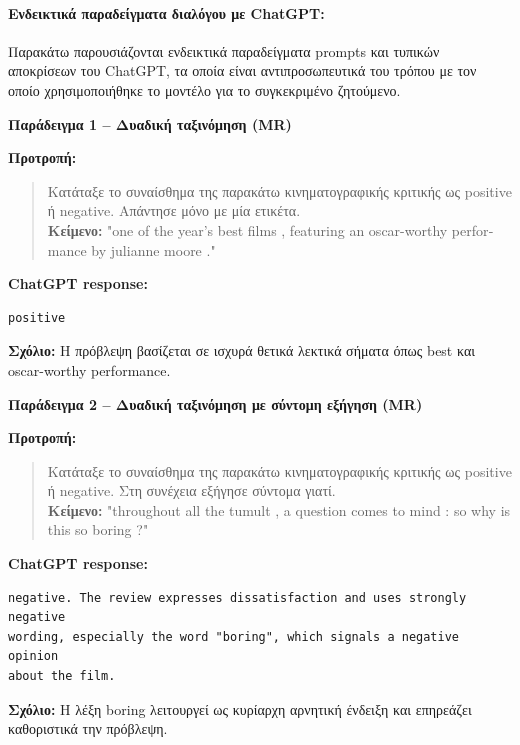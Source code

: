 \documentclass[11pt,a4paper]{article}
\begin{document}
\paragraph{Ενδεικτικά παραδείγματα διαλόγου με \textlatin{ChatGPT}:}

Παρακάτω παρουσιάζονται ενδεικτικά παραδείγματα \textlatin{prompts} και τυπικών αποκρίσεων του \textlatin{ChatGPT}, τα οποία είναι αντιπροσωπευτικά του τρόπου με τον οποίο χρησιμοποιήθηκε το μοντέλο για το συγκεκριμένο ζητούμενο.

\textbf{Παράδειγμα 1 -- Δυαδική ταξινόμηση (\textlatin{MR})}

\textbf{Προτροπή:}
\begin{quote}
Κατάταξε το συναίσθημα της παρακάτω κινηματογραφικής κριτικής ως \textlatin{positive} ή
\textlatin{negative}. Απάντησε μόνο με μία ετικέτα.\\
\textbf{Κείμενο:} \textlatin{"one of the year's best films , featuring an oscar-worthy performance by julianne moore ."}
\end{quote}

\textbf{\textlatin{ChatGPT response:}}
\begin{verbatim}
positive
\end{verbatim}

\textbf{Σχόλιο:} Η πρόβλεψη βασίζεται σε ισχυρά θετικά λεκτικά σήματα όπως \textlatin{best} και \textlatin{oscar-worthy performance}.

\textbf{Παράδειγμα 2 -- Δυαδική ταξινόμηση με σύντομη εξήγηση (\textlatin{MR})}

\textbf{Προτροπή:}
\begin{quote}
Κατάταξε το συναίσθημα της παρακάτω κινηματογραφικής κριτικής ως \textlatin{positive} ή
\textlatin{negative}. Στη συνέχεια εξήγησε σύντομα γιατί.\\
\textbf{Κείμενο:} \textlatin{"throughout all the tumult , a question comes to mind : so why is this so boring ?"}
\end{quote}

\textbf{\textlatin{ChatGPT response:}}
\begin{verbatim}
negative. The review expresses dissatisfaction and uses strongly negative
wording, especially the word "boring", which signals a negative opinion
about the film.
\end{verbatim}

\textbf{Σχόλιο:} Η λέξη \textlatin{boring} λειτουργεί ως κυρίαρχη αρνητική ένδειξη και επηρεάζει καθοριστικά την πρόβλεψη.
\end{document}
